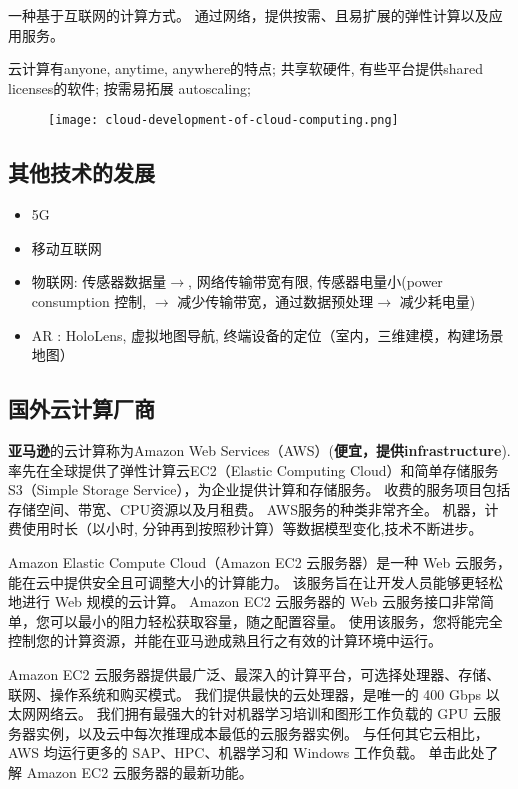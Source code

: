 \begin{definition}[云计算]
    一种基于互联网的计算方式。 通过网络，提供按需、且易扩展的弹性计算以及应用服务。 
\end{definition}

云计算有anyone, anytime, anywhere的特点; 共享软硬件, 有些平台提供shared licenses的软件; 按需易拓展 autoscaling; 

\begin{figure}[htbp]
    \centering
    \texttt{[image: cloud-development-of-cloud-computing.png]}
\end{figure}

\subsection{其他技术的发展}

\begin{itemize}
    \item 5G
    \item 移动互联网
    \item 物联网: 传感器数据量$\rightarrow$, 网络传输带宽有限, 传感器电量小(power consumption 控制,  $\rightarrow$ 减少传输带宽，通过数据预处理$\rightarrow$ 减少耗电量)
    \item AR : HoloLens, 虚拟地图导航, 终端设备的定位（室内，三维建模，构建场景地图）
\end{itemize}

\subsection{国外云计算厂商}

\textbf{亚马逊}的云计算称为Amazon Web Services（AWS）(\textbf{便宜，提供infrastructure}).率先在全球提供了弹性计算云EC2（Elastic Computing Cloud）和简单存储服务S3（Simple Storage Service），为企业提供计算和存储服务。 收费的服务项目包括存储空间、带宽、CPU资源以及月租费。 AWS服务的种类非常齐全。 
机器，计费使用时长（以小时, 分钟再到按照秒计算）等数据模型变化,技术不断进步。

\begin{definition}
    Amazon Elastic Compute Cloud（Amazon EC2 云服务器）是一种 Web 云服务，能在云中提供安全且可调整大小的计算能力。 该服务旨在让开发人员能够更轻松地进行 Web 规模的云计算。 Amazon EC2 云服务器的 Web 云服务接口非常简单，您可以最小的阻力轻松获取容量，随之配置容量。 使用该服务，您将能完全控制您的计算资源，并能在亚马逊成熟且行之有效的计算环境中运行。 

    Amazon EC2 云服务器提供最广泛、最深入的计算平台，可选择处理器、存储、联网、操作系统和购买模式。 我们提供最快的云处理器，是唯一的 400 Gbps 以太网网络云。 我们拥有最强大的针对机器学习培训和图形工作负载的 GPU 云服务器实例，以及云中每次推理成本最低的云服务器实例。 与任何其它云相比，AWS 均运行更多的 SAP、HPC、机器学习和 Windows 工作负载。 单击此处了解 Amazon EC2 云服务器的最新功能。 
\end{definition}

